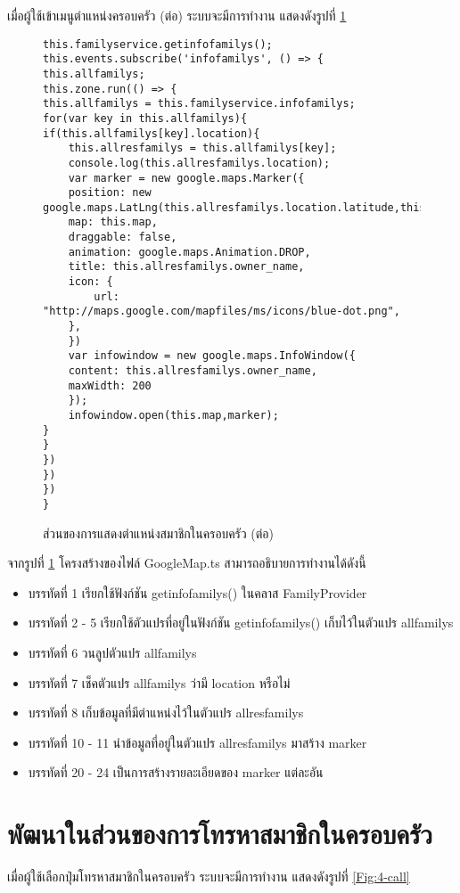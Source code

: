 เมื่อผู้ใช้เข้าเมนูตำแหน่งครอบครัว (ต่อ) ระบบจะมีการทำงาน แสดงดังรูปที่ \ref{Fig:4-googlemapcon1}

\begin{figure}[H]
{\lstset{language=Pascal}
\begin{lstlisting}
this.familyservice.getinfofamilys();
this.events.subscribe('infofamilys', () => {
this.allfamilys;
this.zone.run(() => {
this.allfamilys = this.familyservice.infofamilys;
for(var key in this.allfamilys){
if(this.allfamilys[key].location){
	this.allresfamilys = this.allfamilys[key];
	console.log(this.allresfamilys.location);
	var marker = new google.maps.Marker({
	position: new google.maps.LatLng(this.allresfamilys.location.latitude,this.allresfamilys.location.longitude),
	map: this.map,
	draggable: false,
	animation: google.maps.Animation.DROP,
	title: this.allresfamilys.owner_name,
	icon: {
		url: "http://maps.google.com/mapfiles/ms/icons/blue-dot.png",
	},
	})
	var infowindow = new google.maps.InfoWindow({
	content: this.allresfamilys.owner_name,
	maxWidth: 200
	});
	infowindow.open(this.map,marker);
}
}
})
})
}) 
}
\end{lstlisting}}
\caption{ส่วนของการแสดงตำแหน่งสมาชิกในครอบครัว (ต่อ)}
\label{Fig:4-googlemapcon1}
\end{figure}
\newpage

จากรูปที่ \ref{Fig:4-googlemapcon1} โครงสร้างของไฟล์ GoogleMap.ts สามารถอธิบายการทำงานได้ดังนี้
\begin{itemize}[label={--}]
\item บรรทัดที่ 1 เรียกใช้ฟังก์ชัน getinfofamilys() ในคลาส FamilyProvider
\item บรรทัดที่ 2 - 5 เรียกใช้ตัวแปรที่อยู่ในฟังก์ชัน getinfofamilys() เก็บไว้ในตัวแปร allfamilys
\item บรรทัดที่ 6 วนลูปตัวแปร allfamilys
\item บรรทัดที่ 7 เช็คตัวแปร allfamilys ว่ามี location หรือไม่
\item บรรทัดที่ 8 เก็บข้อมูลที่มีตำแหน่งไว้ในตัวแปร allresfamilys
\item บรรทัดที่ 10 - 11 นำข้อมูลที่อยู่ในตัวแปร allresfamilys มาสร้าง marker
\item บรรทัดที่ 20 - 24 เป็นการสร้างรายละเอียดของ marker แต่ละอัน
\end{itemize}
\newpage



\section{พัฒนาในส่วนของการโทรหาสมาชิกในครอบครัว}
เมื่อผู้ใช้เลือกปุ่มโทรหาสมาชิกในครอบครัว ระบบจะมีการทำงาน แสดงดังรูปที่ \ref{Fig:4-call}

